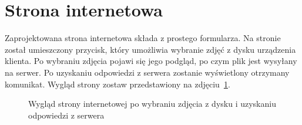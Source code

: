 \section{Strona internetowa}

Zaprojektowana strona internetowa składa z prostego formularza.
Na stronie został umieszczony przycisk, który umożliwia wybranie zdjęć z dysku urządzenia klienta.
Po wybraniu zdjęcia pojawi się jego podgląd, po czym plik jest wysyłany na serwer.
Po uzyskaniu odpowiedzi z serwera zostanie wyświetlony otrzymany komunikat.
Wygląd strony zostaw przedstawiony na zdjęciu~\ref{fig:ja}.

\begin{figure}[H]
    \centering
    \caption{Wygląd strony internetowej po wybraniu zdjęcia z dysku i uzyskaniu odpowiedzi z serwera}
    \customsource
    \label{fig:ja}
\end{figure}
